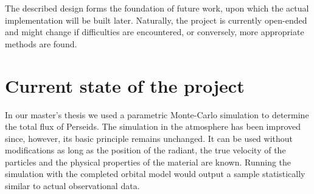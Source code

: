 
The described design forms the foundation of future work, upon which the actual implementation will be built later.
Naturally, the project is currently open-ended and might change if difficulties are encountered,
or conversely, more appropriate methods are found.

%
%

\section{Current state of the project} \label{pc}
    In our master's thesis \citep{balaz-thesis} we used a parametric Monte-Carlo simulation
    to determine the total flux of Perseids.
    The simulation in the atmosphere has been improved since, however, its basic principle
    remains unchanged. It can be used without modifications as long as the position of the radiant,
    the true velocity of the particles and the physical properties of the material are known.
    Running the simulation with the completed orbital model would output a sample statistically
    similar to actual observational data.

